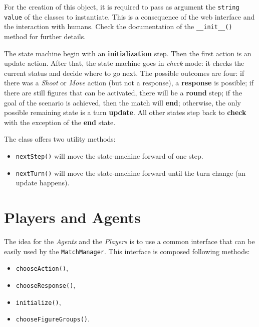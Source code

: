 \documentclass[a4paper]{report}
\begin{document}
	For the creation of this object, it is required to pass as argument the \texttt{string value} of the classes to instantiate. This is a consequence of the web interface and the interaction with humans. Check the documentation of the \texttt{\_\_init\_\_()} method for further details.
	
	The state machine begin with an \textbf{initialization} step. Then the first action is an update action. After that, the state machine goes in \textit{check} mode: it checks the current status and decide where to go next. The possible outcomes are four: if there was a \textit{Shoot} or \textit{Move} action (but not a response), a \textbf{response} is possible; if there are still figures that can be activated, there will be a \textbf{round} step; if the goal of the scenario is achieved, then the match will \textbf{end}; otherwise, the only possible remaining state is a turn \textbf{update}. All other states step back to \textbf{check} with the exception of the \textbf{end} state.

	The class offers two utility methods:
	
	\begin{itemize}
		\item \texttt{nextStep()} will move the state-machine forward of one step.
		\item \texttt{nextTurn()} will move the state-machine forward until the turn change (an update happens).
	\end{itemize}


	\chapter{Players and Agents}

	The idea for the \textit{Agents} and the \textit{Players} is to use a common interface that can be easily used by the \texttt{MatchManager}. This interface is composed following methods:

	\begin{itemize}
		\item \texttt{chooseAction()},
		\item \texttt{chooseResponse()},
		\item \texttt{initialize()},
		\item \texttt{chooseFigureGroups()}.
	\end{itemize}
\end{document}
